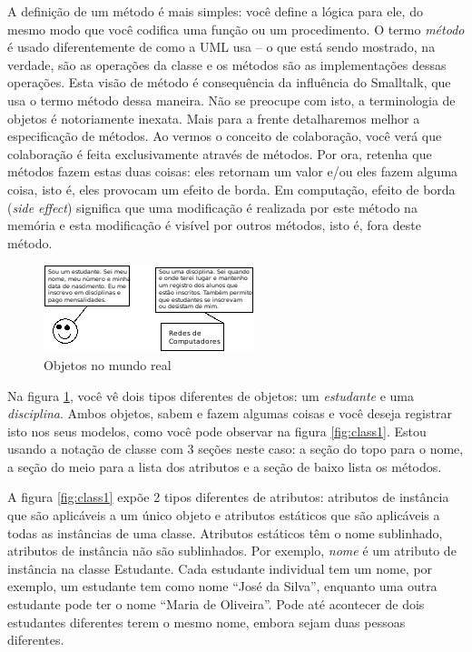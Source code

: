 A definição de um método é mais simples: você define a lógica para ele, do mesmo modo que você codifica uma função ou um procedimento. O termo \emph{método} é usado diferentemente de como a UML usa -- o que está sendo mostrado, na verdade, são as operações da classe e os métodos são as implementações dessas operações. Esta visão de método é consequência da influência do Smalltalk, que usa o termo método dessa maneira. Não se preocupe com isto, a terminologia de objetos é notoriamente inexata. Mais para a frente detalharemos melhor a especificação de métodos. Ao vermos o conceito de colaboração, você verá que colaboração é feita exclusivamente através de métodos. Por ora, retenha que métodos fazem estas duas coisas: eles retornam um valor e/ou eles fazem alguma coisa, isto é, eles provocam um efeito de borda. Em computação, efeito de borda (\emph{side effect}) significa que uma modificação é realizada por este método na memória e esta modificação é visível por outros métodos, isto é, fora deste método.

\begin{figure}
\begin{center}
\includegraphics[scale=1]{obj2.png} 
\caption[Objetos no mundo real]{Objetos no mundo real} \label{fig:obj2}
\end{center}
\end{figure}

Na figura \ref{fig:obj2}, você vê dois tipos diferentes de objetos: um \textit{estudante} e uma \textit{disciplina}. Ambos objetos, sabem e fazem algumas coisas e você deseja registrar isto nos seus modelos, como você pode observar na figura \ref{fig:class1}. Estou usando a notação de classe com 3 seções neste caso: a seção do topo para o nome, a seção do meio para a lista dos atributos e a seção de baixo lista os métodos.

A figura \ref{fig:class1} expõe 2 tipos diferentes de atributos: atributos de instância que são aplicáveis a um único objeto e atributos estáticos que são aplicáveis a todas as instâncias de uma classe. Atributos estáticos têm o nome sublinhado, atributos de instância não são sublinhados. Por exemplo, \emph{nome} é um atributo de instância na classe Estudante. Cada estudante individual tem um nome, por exemplo, um estudante tem como nome ``José da Silva'', enquanto uma outra estudante pode ter o nome ``Maria de Oliveira''. Pode até acontecer de dois estudantes diferentes terem o mesmo nome, embora sejam duas pessoas diferentes.

